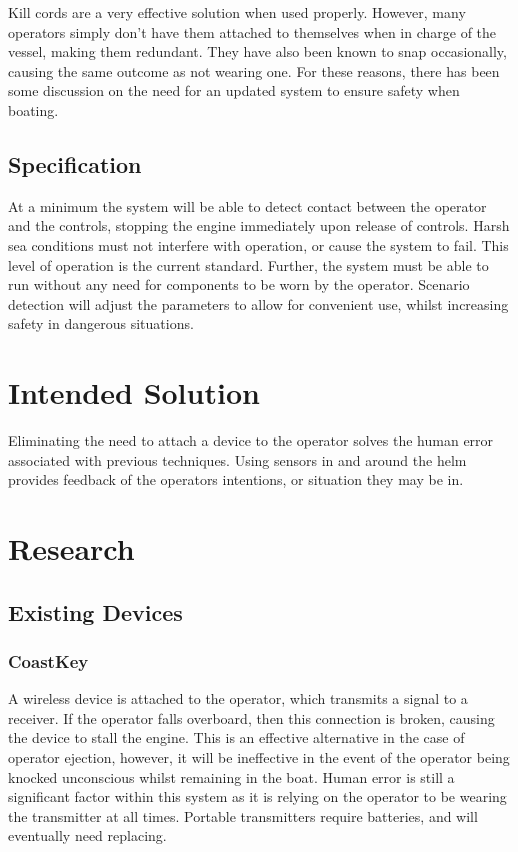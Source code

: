 \documentclass[10pt]{ecsprogressreport}
\begin{document}
Kill cords are a very effective solution when used properly. However, many operators simply don't have them attached to themselves when in charge of the vessel, making them redundant. They have also been known to snap occasionally, causing the same outcome as not wearing one. For these reasons, there has been some discussion on the need for an updated system to ensure safety when boating.


\section{Specification}

At a minimum the system will be able to detect contact between the operator and the controls, stopping the engine immediately upon release of controls. Harsh sea conditions must not interfere with operation, or cause the system to fail. This level of operation is the current standard.
Further, the system must be able to run without any need for components to be worn by the operator. Scenario detection will adjust the parameters to allow for convenient use, whilst increasing safety in dangerous situations. 

\chapter{Intended Solution}

Eliminating the need to attach a device to the operator solves the human error associated with previous techniques. Using sensors in and around the helm provides feedback of the operators intentions, or situation they may be in. 



\chapter{Research}

\section{Existing Devices}

\subsection{CoastKey\cite{}}

A wireless device is attached to the operator, which transmits a signal to a receiver. If the operator falls overboard, then this connection is broken, causing the device to stall the engine. This is an effective alternative in the case of operator ejection, however, it will be ineffective in the event of the operator being knocked unconscious whilst remaining in the boat. Human error is still a significant factor within this system as it is relying on the operator to be wearing the transmitter at all times. Portable transmitters require batteries, and will eventually need replacing. 
\end{document}
